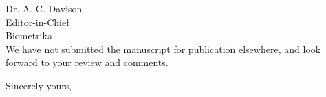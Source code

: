 \documentclass[11pt]{letter} %
\begin{document}
\begin{letter}{Dr. A. C. Davison \\
Editor-in-Chief  \\
Biometrika \\
}
We have not submitted the manuscript for publication elsewhere, and look forward to  your review and comments.

\closing{Sincerely yours,}




\end{letter}
\end{document}
